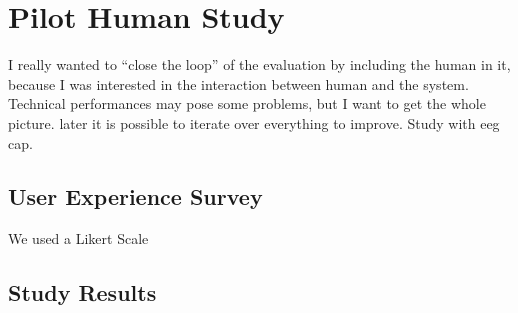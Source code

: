 \chapter{Pilot Human Study}\label{ch:human_study}
I really wanted to ``close the loop'' of the evaluation by including the human in it, because I was interested in the interaction between human and the system.
Technical performances may pose some problems, but I want to get the whole picture.
later it is possible to iterate over everything to improve.
Study with eeg cap.
\section{User Experience Survey}
We used a Likert Scale \cite{likert1932technique}

\section{Study Results}
